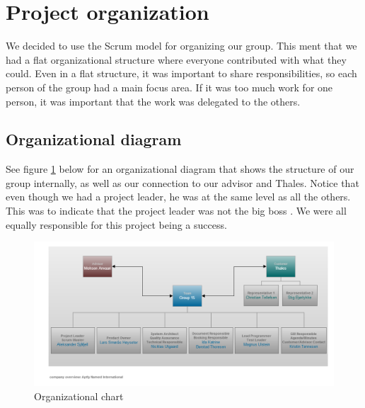 

\section{Project organization}
We decided to use the Scrum model for organizing our group. This ment that we had a flat organizational structure where everyone contributed with what they could. Even in a flat structure, it was important to share responsibilities, so each person of the group had a main focus area. If it was too much work for one person, it was important that the work was delegated to the others.

\subsection{Organizational diagram}
See figure \ref{fig:organizationalchart} below for an organizational diagram that shows the structure of our group internally, as well as our connection to our advisor and Thales. Notice that even though we had a project leader, he was at the same level as all the others. This was to indicate that the project leader was not the big boss . We were all equally responsible for this project being a success.
\begin{figure}[hbt]
\begin{center}
\includegraphics[width=\textwidth]{Organizational_Chart_v2}
\caption{Organizational chart} \label{fig:organizationalchart}
\end{center}
\end{figure}

\newpage

